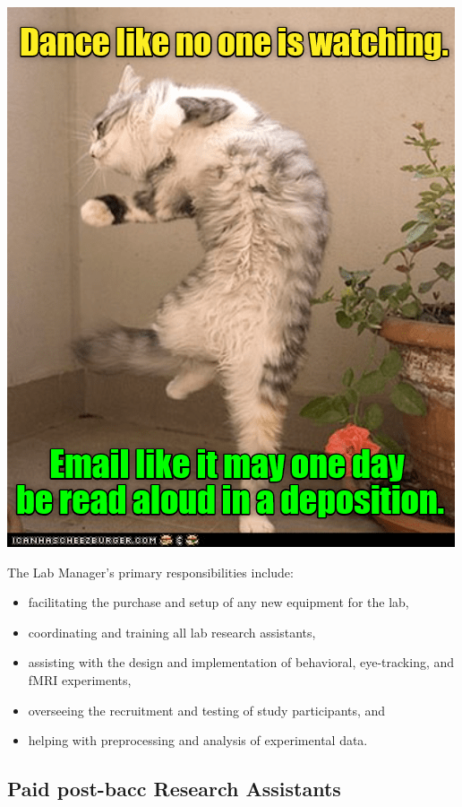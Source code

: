 \documentclass[]{book}
\providecommand{\tightlist}{%
  \setlength{\itemsep}{0pt}\setlength{\parskip}{0pt}}
\begin{document}
\includegraphics{images/email.png}

The Lab Manager's primary responsibilities include:

\begin{itemize}
\tightlist
\item
  facilitating the purchase and setup of any new equipment for the lab,\\
\item
  coordinating and training all lab research assistants,\\
\item
  assisting with the design and implementation of behavioral, eye-tracking, and fMRI experiments,\\
\item
  overseeing the recruitment and testing of study participants, and\\
\item
  helping with preprocessing and analysis of experimental data.
\end{itemize}

\hypertarget{paid-post-bacc-research-assistants}{%
\subsection{Paid post-bacc Research Assistants}\label{paid-post-bacc-research-assistants}}
\end{document}
